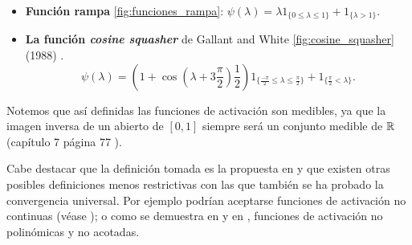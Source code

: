 \begin{definicion}
\begin{itemize}
        \item \textbf{Función rampa} \ref{fig:funciones_rampa}: $\psi(\lambda)  = \lambda 1_{\{0 \leq \lambda \leq  1\}} + 1_{\{\lambda > 1\}}.$
    
        \item \textbf{La función \textit{cosine squasher}} de Gallant and White 
        \ref{fig:cosine_squasher} (1988) \cite{Gallant88thereexists}. 
        \begin{equation*}
    \psi(\lambda )= \left(1 + \cos\left(\lambda + 3 \frac{\pi}{2} \right) \frac{1}{2}\right) 
     1_{\{\frac{-\pi}{2} \leq \lambda \leq  \frac{\pi}{2}\}}
     +
     1_{\{ \frac{\pi}{2} < \lambda \}}.
    \end{equation*}
    \end{itemize}

   Notemos que así definidas las funciones de activación son medibles, ya que la imagen inversa de un abierto de $[0,1]$ siempre será un conjunto medible de  $\mathbb{R}$  (capítulo 7  página 77 \cite{nla.cat-vn1819421}).
    

    Cabe destacar que la definición tomada es la propuesta en \cite{HORNIK1989359} y que existen
    otras posibles definiciones menos restrictivas con las que también se ha probado la convergencia universal.
    Por ejemplo podrían aceptarse funciones de activación no continuas (véase \cite{FUNAHASHI1989183}); 
    o como 
    se demuestra en \cite{DBLP:journals/corr/SonodaM15} y en \cite{non-polynomial-activation-functions}, funciones de activación no polinómicas y no acotadas. 
\end{definicion}

\setlength{\marginparwidth}{\smallMarginSize}
\setlength{\marginparwidth}{\bigMarginSize}


